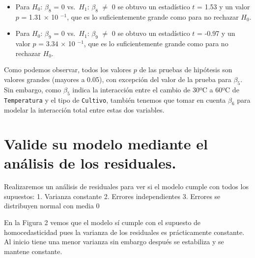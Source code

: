 \documentclass[10pt, spanish]{article}
\providecommand{\tightlist}{%
      \setlength{\itemsep}{0pt}\setlength{\parskip}{0pt}}
\begin{document}
    \begin{itemize}
\tightlist
\item
  Para \(H_0\): \(\beta_8\) = 0 vs.~\(H_1\): \(\beta_8\) \(\neq\) 0 se
  obtuvo un estadístico \(t\) = 1.53 y un valor \(p\) = 1.31 \(\times\)
  10 \(^{-1}\), que es lo suficientemente grande como para no rechazar
  \(H_0\).
\end{itemize}


    \begin{itemize}
\tightlist
\item
  Para \(H_0\): \(\beta_9\) = 0 vs.~\(H_1\): \(\beta_9\) \(\neq\) 0 se
  obtuvo un estadístico \(t\) = -0.97 y un valor \(p\) = 3.34 \(\times\)
  10 \(^{-1}\), que es lo suficientemente grande como para no rechazar
  \(H_0\).
\end{itemize}


    Como podemos observar, todos los valores $p$ de las pruebas de hipótesis
son valores grandes (mayores a 0.05), con excepción del valor de la
prueba para \(\beta_5\). Sin embargo, como \(\beta_5\) indica la
interacción entre el cambio de 30ºC a 60ºC de \texttt{Temperatura} y el
tipo de \texttt{Cultivo}, también tenemos que tomar en cuenta
\(\beta_6\) para modelar la interacción total entre estas dos variables.

    \hypertarget{valide-su-modelo-mediante-el-anuxe1lisis-de-los-residuales.}{%
\section{Valide su modelo mediante el análisis de los
residuales.}\label{valide-su-modelo-mediante-el-anuxe1lisis-de-los-residuales.}}

    Realizaremos un análisis de residuales para ver si el modelo cumple con
todos los supuestos: 1. Varianza constante 2. Errores independientes 3.
Errores se distribuyen normal con media 0

    \begin{center}
    \end{center}


    En la Figura 2 vemos que el modelo sí cumple con el supuesto de
homocedasticidad pues la varianza de los residuales es prácticamente
constante. Al inicio tiene una menor varianza sin embargo después se
estabiliza y se mantene constante.

    \begin{center}
    \end{center}
\end{document}
